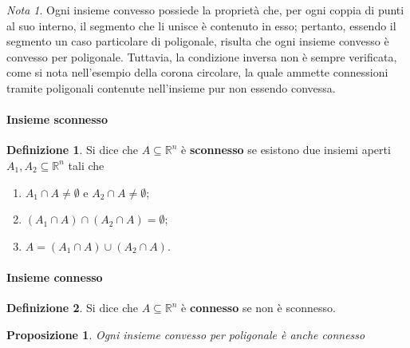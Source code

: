 \documentclass{article}
\theoremstyle{plain}
\newtheorem{prop}[thm]{Proposizione}
\theoremstyle{definition}
\newtheorem{defn}{Definizione}[section]
\theoremstyle{remark}
\newtheorem{note}{Nota}
\begin{document}
\vspace{10pt}

\begin{note}
    Ogni insieme convesso possiede la proprietà che, per ogni coppia di punti al suo interno, il segmento che li unisce è contenuto in esso; pertanto, 
    essendo il segmento un caso particolare di poligonale, risulta che ogni insieme convesso è convesso per poligonale. 
    Tuttavia, la condizione inversa non è sempre verificata, come si nota nell'esempio della corona circolare, la quale ammette connessioni tramite 
    poligonali contenute nell'insieme pur non essendo convessa.
\end{note}

\vspace{10pt}

\paragraph{Insieme sconnesso}
\begin{bxthm}
\begin{defn}
    Si dice che $A\subseteq\mathbb{R}^n$ è \textbf{sconnesso} se esistono due insiemi aperti $A_1,A_2\subseteq\mathbb{R}^n$ tali che 
    \begin{enumerate}
        \item $A_1\cap A\neq\emptyset$ e $A_2\cap A\neq\emptyset$;
        \item $(A_1\cap A)\cap(A_2\cap A)=\emptyset$;
        \item $A=(A_1\cap A)\cup(A_2\cap A)$.
    \end{enumerate}
\end{defn}
\end{bxthm}

\vspace{10pt}

\paragraph{Insieme connesso}
\begin{bxthm}
\begin{defn}
    Si dice che $A\subseteq\mathbb{R}^n$ è \textbf{connesso} se non è sconnesso.
\end{defn}
\end{bxthm}

\vspace{10pt}

\begin{bxthm}
\begin{prop}
    Ogni insieme convesso per poligonale è anche connesso
\end{prop}
\end{bxthm}
\end{document}
